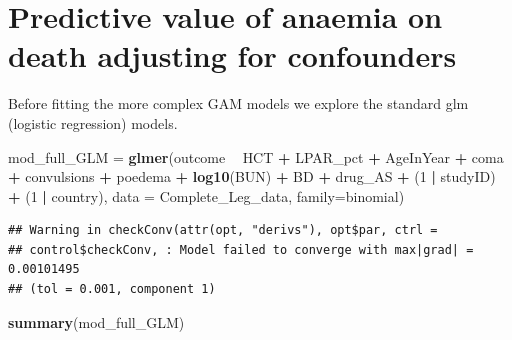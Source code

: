 \documentclass[]{article}
\newenvironment{Shaded}{\begin{snugshade}}{\end{snugshade}}
\newcommand{\KeywordTok}[1]{\textcolor[rgb]{0.13,0.29,0.53}{\textbf{#1}}}
\newcommand{\DataTypeTok}[1]{\textcolor[rgb]{0.13,0.29,0.53}{#1}}
\newcommand{\DecValTok}[1]{\textcolor[rgb]{0.00,0.00,0.81}{#1}}
\newcommand{\StringTok}[1]{\textcolor[rgb]{0.31,0.60,0.02}{#1}}
\newcommand{\OperatorTok}[1]{\textcolor[rgb]{0.81,0.36,0.00}{\textbf{#1}}}
\newcommand{\NormalTok}[1]{#1}
\begin{document}
\section{Predictive value of anaemia on death adjusting for
confounders}\label{predictive-value-of-anaemia-on-death-adjusting-for-confounders}

Before fitting the more complex GAM models we explore the standard glm
(logistic regression) models.

\begin{Shaded}
\begin{Highlighting}[]
\NormalTok{mod_full_GLM =}\StringTok{ }\KeywordTok{glmer}\NormalTok{(outcome }\OperatorTok{~}\StringTok{ }\NormalTok{HCT }\OperatorTok{+}\StringTok{ }\NormalTok{LPAR_pct }\OperatorTok{+}\StringTok{ }\NormalTok{AgeInYear }\OperatorTok{+}\StringTok{ }\NormalTok{coma }\OperatorTok{+}\StringTok{ }\NormalTok{convulsions }\OperatorTok{+}
\StringTok{                       }\NormalTok{poedema }\OperatorTok{+}\StringTok{ }\KeywordTok{log10}\NormalTok{(BUN) }\OperatorTok{+}\StringTok{ }\NormalTok{BD }\OperatorTok{+}\StringTok{ }\NormalTok{drug_AS }\OperatorTok{+}\StringTok{ }
\StringTok{                       }\NormalTok{(}\DecValTok{1} \OperatorTok{|}\StringTok{ }\NormalTok{studyID) }\OperatorTok{+}\StringTok{ }\NormalTok{(}\DecValTok{1} \OperatorTok{|}\StringTok{ }\NormalTok{country),}
                     \DataTypeTok{data =}\NormalTok{ Complete_Leg_data, }\DataTypeTok{family=}\NormalTok{binomial)}
\end{Highlighting}
\end{Shaded}

\begin{verbatim}
## Warning in checkConv(attr(opt, "derivs"), opt$par, ctrl =
## control$checkConv, : Model failed to converge with max|grad| = 0.00101495
## (tol = 0.001, component 1)
\end{verbatim}

\begin{Shaded}
\begin{Highlighting}[]
\KeywordTok{summary}\NormalTok{(mod_full_GLM)}
\end{Highlighting}
\end{Shaded}
\end{document}
